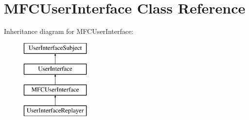 \hypertarget{classMFCUserInterface}{
\section{MFCUserInterface Class Reference}
\label{classMFCUserInterface}
}
Inheritance diagram for MFCUserInterface:\begin{figure}[H]
\begin{center}
\leavevmode
\includegraphics[height=4cm]{classMFCUserInterface}
\end{center}
\end{figure}

